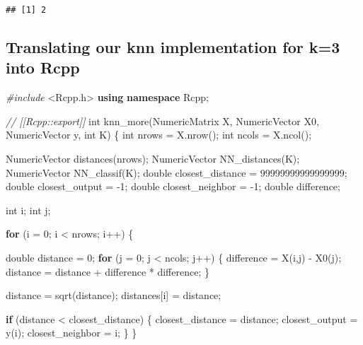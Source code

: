 \documentclass[]{article}
\newenvironment{Shaded}{\begin{snugshade}}{\end{snugshade}}
\newcommand{\CommentTok}[1]{\textcolor[rgb]{0.56,0.35,0.01}{\textit{#1}}}
\newcommand{\ControlFlowTok}[1]{\textcolor[rgb]{0.13,0.29,0.53}{\textbf{#1}}}
\newcommand{\DataTypeTok}[1]{\textcolor[rgb]{0.13,0.29,0.53}{#1}}
\newcommand{\DecValTok}[1]{\textcolor[rgb]{0.00,0.00,0.81}{#1}}
\newcommand{\ImportTok}[1]{#1}
\newcommand{\KeywordTok}[1]{\textcolor[rgb]{0.13,0.29,0.53}{\textbf{#1}}}
\newcommand{\NormalTok}[1]{#1}
\newcommand{\PreprocessorTok}[1]{\textcolor[rgb]{0.56,0.35,0.01}{\textit{#1}}}
\begin{document}
\begin{verbatim}
## [1] 2
\end{verbatim}

\newpage

\hypertarget{translating-our-knn-implementation-for-k3-into-rcpp}{%
\subsection{Translating our knn implementation for k=3 into
Rcpp}\label{translating-our-knn-implementation-for-k3-into-rcpp}}

\begin{Shaded}
\begin{Highlighting}[]
\PreprocessorTok{#include }\ImportTok{<Rcpp.h>}
\KeywordTok{using} \KeywordTok{namespace}\NormalTok{ Rcpp;}

\CommentTok{// [[Rcpp::export]]}
\DataTypeTok{int}\NormalTok{ knn_more(NumericMatrix X, NumericVector X0, NumericVector y, }\DataTypeTok{int}\NormalTok{ K) \{}
    \DataTypeTok{int}\NormalTok{ nrows = X.nrow();}
    \DataTypeTok{int}\NormalTok{ ncols = X.ncol();}

\NormalTok{    NumericVector distances(nrows);}
\NormalTok{    NumericVector NN_distances(K);}
\NormalTok{    NumericVector NN_classif(K);}
    \DataTypeTok{double}\NormalTok{ closest_distance = }\DecValTok{99999999999999999}\NormalTok{;}
    \DataTypeTok{double}\NormalTok{ closest_output = -}\DecValTok{1}\NormalTok{;}
    \DataTypeTok{double}\NormalTok{ closest_neighbor = -}\DecValTok{1}\NormalTok{;}
    \DataTypeTok{double}\NormalTok{ difference;}

    \DataTypeTok{int}\NormalTok{ i;}
    \DataTypeTok{int}\NormalTok{ j;}
    

    \ControlFlowTok{for}\NormalTok{ (i = }\DecValTok{0}\NormalTok{; i < nrows; i++) \{}
        
        \DataTypeTok{double}\NormalTok{ distance = }\DecValTok{0}\NormalTok{;}
        \ControlFlowTok{for}\NormalTok{ (j = }\DecValTok{0}\NormalTok{; j < ncols; j++) \{}
\NormalTok{            difference = X(i,j) - X0(j);}
\NormalTok{            distance = distance + difference * difference;}
\NormalTok{        \}}

\NormalTok{        distance = sqrt(distance);}
\NormalTok{        distances[i] = distance;}

        \ControlFlowTok{if}\NormalTok{ (distance < closest_distance) \{}
\NormalTok{            closest_distance = distance;}
\NormalTok{            closest_output = y(i);}
\NormalTok{            closest_neighbor = i;}
\NormalTok{        \}}
\NormalTok{    \}}


\end{Highlighting}
\end{Shaded}
\end{document}
